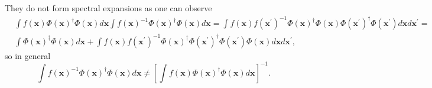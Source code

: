 \documentclass[aps,preprint]{revtex4}%
\begin{document}
They do not form spectral expansions as one can observe
\begin{align}
&  \int f\left(  \mathbf{x}\right)  \Phi\left(  \mathbf{x}\right)  ^{\dagger
}\Phi\left(  \mathbf{x}\right)  d\mathbf{x}\int f\left(  \mathbf{x}\right)
^{-1}\Phi\left(  \mathbf{x}\right)  ^{\dagger}\Phi\left(  \mathbf{x}\right)
d\mathbf{x=}\int f\left(  \mathbf{x}\right)  f\left(  \mathbf{x}^{\prime
}\right)  ^{-1}\Phi\left(  \mathbf{x}\right)  ^{\dagger}\Phi\left(
\mathbf{x}\right)  \Phi\left(  \mathbf{x}^{\prime}\right)  ^{\dagger}%
\Phi\left(  \mathbf{x}^{\prime}\right)  d\mathbf{x}d\mathbf{x}^{\prime
}=\nonumber\\
&  \int\Phi\left(  \mathbf{x}\right)  ^{\dagger}\Phi\left(  \mathbf{x}\right)
d\mathbf{x+}\int f\left(  \mathbf{x}\right)  f\left(  \mathbf{x}^{\prime
}\right)  ^{-1}\Phi\left(  \mathbf{x}\right)  ^{\dagger}\Phi\left(
\mathbf{x}^{\prime}\right)  ^{\dagger}\Phi\left(  \mathbf{x}^{\prime}\right)
\Phi\left(  \mathbf{x}\right)  d\mathbf{x}d\mathbf{x}^{\prime},
\end{align}
so in general
\begin{equation}
\int f\left(  \mathbf{x}\right)  ^{-1}\Phi\left(  \mathbf{x}\right)
^{\dagger}\Phi\left(  \mathbf{x}\right)  d\mathbf{x\neq}\left[  \int f\left(
\mathbf{x}\right)  \Phi\left(  \mathbf{x}\right)  ^{\dagger}\Phi\left(
\mathbf{x}\right)  d\mathbf{x}\right]  ^{-1}.
\end{equation}
\end{document}
